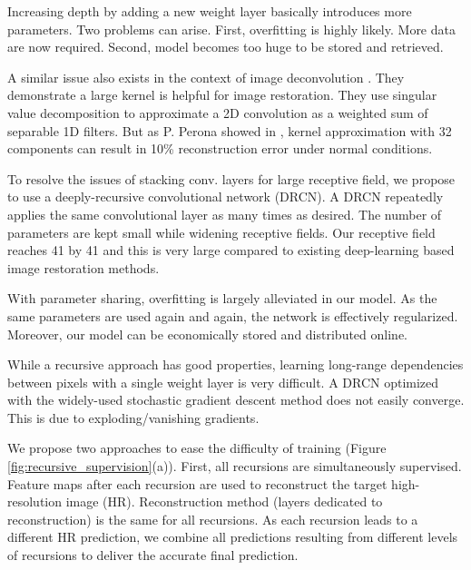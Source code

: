 \documentclass[10pt,twocolumn,letterpaper]{article}
\begin{document}
Increasing depth by adding a new weight layer basically introduces more parameters. Two problems can arise. First, overfitting is highly likely. More data are now required. Second, model becomes too huge to be stored and retrieved.

A similar issue also exists in the context of image deconvolution \cite{xu2014deep}. They demonstrate a large kernel is helpful for image restoration. They use singular value decomposition to approximate a 2D convolution as a weighted sum of separable 1D filters. But as P. Perona showed in \cite{perona1995deformable},  kernel approximation with 32 components can result in 10\% reconstruction error under normal conditions. 



To resolve the issues of stacking conv. layers for large receptive field, we propose to use a deeply-recursive convolutional network (DRCN). A DRCN repeatedly applies the same convolutional layer as many times as desired. The number of parameters are kept small while widening receptive fields. Our receptive field reaches 41 by 41 and this is very large compared to existing deep-learning based image restoration methods. 

With parameter sharing, overfitting is largely alleviated in our model. As the same parameters are used again and again, the network is effectively regularized. Moreover, our model can be economically stored and distributed online.   

While a recursive approach has good properties, learning long-range dependencies between pixels with a single weight layer is very difficult. A DRCN optimized with the widely-used stochastic gradient descent method does not easily converge. This is due to exploding/vanishing gradients. 

We propose two approaches to ease the difficulty of training (Figure \ref{fig:recursive_supervision}(a)). First, all recursions are simultaneously supervised. Feature maps after each recursion are used to reconstruct the target high-resolution image (HR). Reconstruction method (layers dedicated to reconstruction) is the same for all recursions. As each recursion leads to a different HR prediction, we combine all predictions resulting from different levels of recursions to deliver the accurate final prediction.  
   
\end{document}
